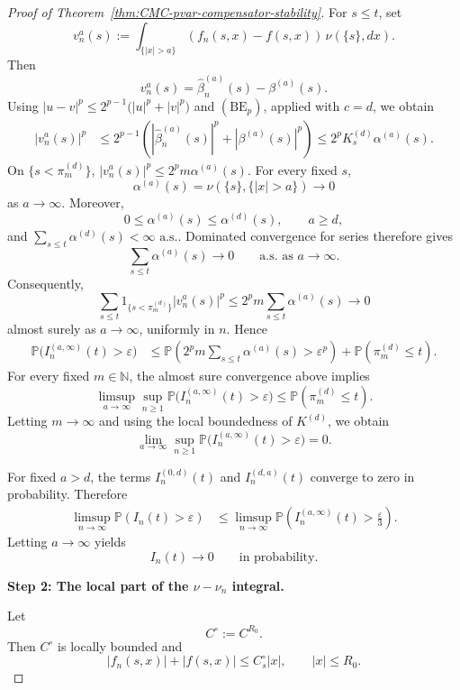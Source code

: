 \documentclass[a4paper,10pt]{article}
\renewcommand{\P}{\mathbb P}
\begin{document}
\begin{proof}[Proof of Theorem~\ref{thm:CMC-pvar-compensator-stability}]
For \(s\le t\), set
\[
v_n^a(s)
:=
\int_{\{|x|>a\}}
(f_n(s,x)-f(s,x))\,\nu(\{s\},dx).
\]
Then
\[
        v_n^a(s)
        =
        \widehat\beta_n^{(a)}(s)-\beta^{(a)}(s).
\]
Using
$
|u-v|^p
\le
2^{p-1}\bigl(|u|^p+|v|^p\bigr)
$
and \((\mathrm{BE}_p)\), applied with \(c=d\), we obtain
\[
\begin{aligned}
|v_n^a(s)|^p
&\le
2^{p-1}
\left(
|\widehat\beta_n^{(a)}(s)|^p
+
|\beta^{(a)}(s)|^p
\right)
\le
2^pK_s^{(d)}\alpha^{(a)}(s).
\end{aligned}
\]
On \(\{s<\pi_m^{(d)}\}\),
$
        |v_n^a(s)|^p
        \le
        2^pm\alpha^{(a)}(s).
$
For every fixed \(s\),
\[
        \alpha^{(a)}(s)
        =
        \nu(\{s\},\{|x|>a\})
        \longrightarrow0
\]
as \(a\to\infty\). Moreover,
\[
        0\le\alpha^{(a)}(s)\le\alpha^{(d)}(s),
        \qquad a\ge d,
\]
and
$
        \sum_{s\le t}\alpha^{(d)}(s)<\infty
        \text{ a.s..}
$
Dominated convergence for series therefore gives
\[
        \sum_{s\le t}\alpha^{(a)}(s)
        \longrightarrow0
        \qquad\text{a.s. as }a\to\infty.
\]
Consequently,
\[
\sum_{s\le t}
1_{\{s<\pi_m^{(d)}\}}
|v_n^a(s)|^p
\le
2^pm\sum_{s\le t}\alpha^{(a)}(s)
\longrightarrow0
\]
almost surely as \(a\to\infty\), uniformly in \(n\). Hence
\[
\begin{aligned}
\P\bigl(I_n^{(a,\infty)}(t)>\varepsilon\bigr)
&\le
\P\left(
2^pm\sum_{s\le t}\alpha^{(a)}(s)>\varepsilon^p
\right)
+
\P(\pi_m^{(d)}\le t).
\end{aligned}
\]
For every fixed \(m\in\mathbb N\), the almost sure convergence above
implies
\[
\limsup_{a\to\infty}
\sup_{n\ge1}
\P\bigl(I_n^{(a,\infty)}(t)>\varepsilon\bigr)
\le
\P(\pi_m^{(d)}\le t).
\]
Letting \(m\to\infty\) and using the local boundedness of
\(K^{(d)}\), we obtain
\[
\lim_{a\to\infty}
\sup_{n\ge1}
\P\bigl(I_n^{(a,\infty)}(t)>\varepsilon\bigr)
=
0.
\]

For fixed \(a>d\), the terms \(I_n^{(0,d)}(t)\) and
\(I_n^{(d,a)}(t)\) converge to zero in probability. Therefore
\[
\begin{aligned}
\limsup_{n\to\infty}\P(I_n(t)>\varepsilon)
&\le
\limsup_{n\to\infty}
\P\left(
I_n^{(a,\infty)}(t)>\frac{\varepsilon}{3}
\right).
\end{aligned}
\]
Letting \(a\to\infty\) yields
\[
        I_n(t)\longrightarrow0
        \qquad\text{in probability}.
\]

\medskip
\noindent
\textbf{Step 2: The local part of the \(\nu-\nu_n\) integral.}
\medskip

Let
\[
        C^\circ:=C^{R_0}.
\]
Then \(C^\circ\) is locally bounded and
\[
        |f_n(s,x)|+|f(s,x)|
        \le C^\circ_s|x|,
        \qquad |x|\le R_0.
\]


\end{proof}
\end{document}
